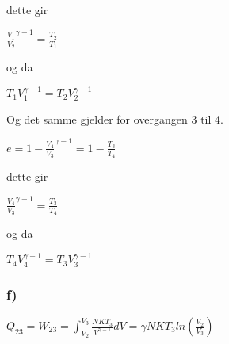 \documentclass[12pt]{article}
\begin{document}
dette gir

$  \frac{V_1}{V_2}^{\gamma-1} = \frac{T_2}{T_1}$ 

og da 

$T_1 V_1^{\gamma-1} = T_2 V_2^{\gamma-1} $

Og det samme gjelder for overgangen 3 til 4. 

$ e = 1-\frac{V_4}{V_3}^{\gamma - 1} = 1 - \frac{T_3}{T_4}$

dette gir

$  \frac{V_4}{V_3}^{\gamma-1} = \frac{T_3}{T_4}$ 

og da 

$T_4 V_4^{\gamma-1} = T_3 V_3^{\gamma-1} $


\subsubsection*{f)}


$ Q_{23} = W_{23} = \int_{V_2}^{V_3} \frac{NKT_3}{V^{\gamma-1}}dV = \gamma NKT_3ln(\frac{V_2}{V_3}) $

 
\end{document}
